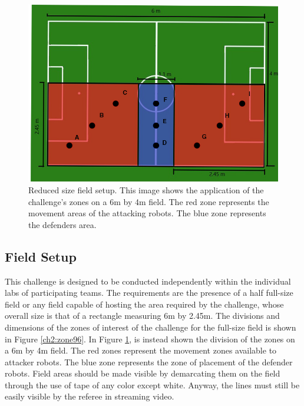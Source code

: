 \begin{figure}[ht]
\includegraphics[width=0.95\linewidth]{figs/ch_2_reduced.jpg}
\caption{Reduced size field setup. This image shows the application of the challenge's zones on a 6m by 4m field. The red zone represents the movement areas of the attacking robots. The blue zone represents the defenders area.}
\label{ch2:zone64}
\centering
\end{figure}


\subsection{Field Setup}
This challenge is designed to be conducted independently within the individual labs of participating teams. The requirements are the presence of a half full-size field or any field capable of hosting the area required by the challenge, whose overall size is that of a rectangle measuring 6m by 2.45m.  
The divisions and dimensions of the zones of interest of the challenge for the full-size field is shown in Figure \ref{ch2:zone96}. In Figure \ref{ch2:zone64}, is instead shown the division of the zones on a 6m by 4m field.
The red zones represent the movement zones available to attacker robots. The blue zone represents the zone of placement of the defender robots.
Field areas should be made visible by demarcating them on the field through the use of tape of any color except white. Anyway, the lines must still be easily visible by the referee in streaming video.


